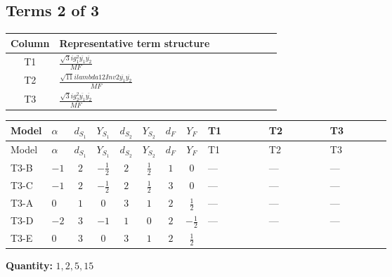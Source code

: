 \documentclass[8pt]{article}
\begin{document}
\begin{landscape}
\subsection*{Terms 2 of 3}
\begin{center}
\begin{tabular}{@{}c >{\raggedright\arraybackslash}p{0.82\linewidth}@{}}
\toprule
Column & Representative term structure \\
\midrule
T1 & \(\displaystyle \frac{\sqrt{3} i g_{1}^{2} \overline{y_{1}} \overline{y_{2}}}{MF}\) \\
\midrule
T2 & \(\displaystyle \frac{\sqrt{11} i lambda12Inv2 \overline{y_{1}} \overline{y_{2}}}{MF}\) \\
\midrule
T3 & \(\displaystyle \frac{\sqrt{3} i g_{2}^{2} \overline{y_{1}} \overline{y_{2}}}{MF}\) \\
\midrule
\bottomrule
\end{tabular}
\end{center}
\smallskip
\tiny
\begin{longtable}{@{}llcccccc >{\raggedright\arraybackslash}p{0.21\linewidth} >{\raggedright\arraybackslash}p{0.21\linewidth} >{\raggedright\arraybackslash}p{0.21\linewidth}@{}}
\toprule
Model & $\alpha$ & $d_{S_1}$ & $Y_{S_1}$ & $d_{S_2}$ & $Y_{S_2}$ & $d_F$ & $Y_F$ & T1 & T2 & T3 \\
\midrule
\endfirsthead
\toprule
Model & $\alpha$ & $d_{S_1}$ & $Y_{S_1}$ & $d_{S_2}$ & $Y_{S_2}$ & $d_F$ & $Y_F$ & T1 & T2 & T3 \\
\midrule
\endhead
T3-B & $-1$ & $2$ & $-\frac{1}{2}$ & $2$ & $\frac{1}{2}$ & $1$ & $0$ & --- & --- & --- \\
\midrule
T3-C & $-1$ & $2$ & $-\frac{1}{2}$ & $2$ & $\frac{1}{2}$ & $3$ & $0$ & --- & --- & --- \\
\midrule
T3-A & $0$ & $1$ & $0$ & $3$ & $1$ & $2$ & $\frac{1}{2}$ & --- & --- & --- \\
\midrule
T3-D & $-2$ & $3$ & $-1$ & $1$ & $0$ & $2$ & $-\frac{1}{2}$ & --- & --- & --- \\
\midrule
T3-E & $0$ & $3$ & $0$ & $3$ & $1$ & $2$ & $\frac{1}{2}$ & \scriptsize\adjustbox{max width=\linewidth}{$\begin{gathered} \frac{\sqrt{3} i g_{1}^{2} \overline{y_{1}} \overline{y_{2}}}{8 MF}\end{gathered}$} & \scriptsize\adjustbox{max width=\linewidth}{$\begin{gathered} \frac{3 \sqrt{11} i lambda12Inv2 \overline{y_{1}} \overline{y_{2}}}{22 MF}\end{gathered}$} & \scriptsize\adjustbox{max width=\linewidth}{$\begin{gathered} \frac{15 \sqrt{3} i g_{2}^{2} \overline{y_{1}} \overline{y_{2}}}{8 MF}\end{gathered}$} \\
\midrule
\bottomrule
\end{longtable}
\clearpage
\noindent\textbf{Quantity: }$\mathrm{1,2,5,15}$\par\smallskip

\end{landscape}
\end{document}
